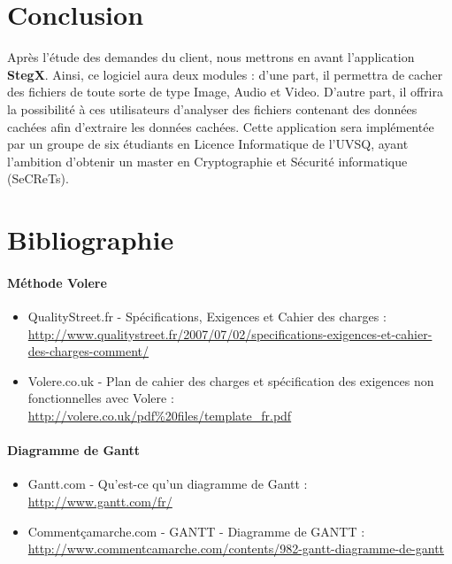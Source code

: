 \documentclass[11pt]{article}
\begin{document}
\section{Conclusion}

Après l'étude des demandes du client, nous mettrons en avant l'application
\textbf{StegX}. 
Ainsi, ce logiciel aura deux modules : d'une part, il permettra de cacher 
des fichiers de toute sorte de type Image, Audio et Video. 
D'autre part, il offrira la possibilité à ces utilisateurs d'analyser des 
fichiers contenant des données cachées afin d'extraire les données cachées. \newline
Cette application sera implémentée par un groupe de six
étudiants en Licence Informatique de l'UVSQ, ayant l'ambition d'obtenir un master en
Cryptographie et Sécurité informatique (SeCReTs). 

\newpage

\section{Bibliographie}

\paragraph{Méthode Volere}
\begin{itemize}
\item QualityStreet.fr - Spécifications, Exigences et Cahier des charges : \\
    \url{http://www.qualitystreet.fr/2007/07/02/specifications-exigences-et-cahier-des-charges-comment/}
\item Volere.co.uk - Plan de cahier des charges et spécification des exigences
    non fonctionnelles avec Volere : \\
    \url{http://volere.co.uk/pdf%20files/template_fr.pdf}
\end{itemize}

\paragraph{Diagramme de Gantt}
\begin{itemize}
\item Gantt.com - Qu'est-ce qu'un diagramme de Gantt : \\
    \url{http://www.gantt.com/fr/}
\item Commentçamarche.com - GANTT - Diagramme de GANTT : \\
    \url{http://www.commentcamarche.com/contents/982-gantt-diagramme-de-gantt}
\end{itemize}
\end{document}
